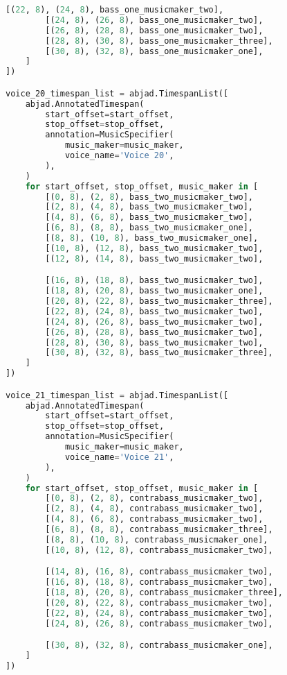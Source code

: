 \begin{lstlisting}[language=Python, caption=Invocation Source Code]
        [(22, 8), (24, 8), bass_one_musicmaker_two],
        [(24, 8), (26, 8), bass_one_musicmaker_two],
        [(26, 8), (28, 8), bass_one_musicmaker_two],
        [(28, 8), (30, 8), bass_one_musicmaker_three],
        [(30, 8), (32, 8), bass_one_musicmaker_one],
    ]
])

voice_20_timespan_list = abjad.TimespanList([
    abjad.AnnotatedTimespan(
        start_offset=start_offset,
        stop_offset=stop_offset,
        annotation=MusicSpecifier(
            music_maker=music_maker,
            voice_name='Voice 20',
        ),
    )
    for start_offset, stop_offset, music_maker in [
        [(0, 8), (2, 8), bass_two_musicmaker_two],
        [(2, 8), (4, 8), bass_two_musicmaker_two],
        [(4, 8), (6, 8), bass_two_musicmaker_two],
        [(6, 8), (8, 8), bass_two_musicmaker_one],
        [(8, 8), (10, 8), bass_two_musicmaker_one],
        [(10, 8), (12, 8), bass_two_musicmaker_two],
        [(12, 8), (14, 8), bass_two_musicmaker_two],

        [(16, 8), (18, 8), bass_two_musicmaker_two],
        [(18, 8), (20, 8), bass_two_musicmaker_one],
        [(20, 8), (22, 8), bass_two_musicmaker_three],
        [(22, 8), (24, 8), bass_two_musicmaker_two],
        [(24, 8), (26, 8), bass_two_musicmaker_two],
        [(26, 8), (28, 8), bass_two_musicmaker_two],
        [(28, 8), (30, 8), bass_two_musicmaker_two],
        [(30, 8), (32, 8), bass_two_musicmaker_three],
    ]
])

voice_21_timespan_list = abjad.TimespanList([
    abjad.AnnotatedTimespan(
        start_offset=start_offset,
        stop_offset=stop_offset,
        annotation=MusicSpecifier(
            music_maker=music_maker,
            voice_name='Voice 21',
        ),
    )
    for start_offset, stop_offset, music_maker in [
        [(0, 8), (2, 8), contrabass_musicmaker_two],
        [(2, 8), (4, 8), contrabass_musicmaker_two],
        [(4, 8), (6, 8), contrabass_musicmaker_two],
        [(6, 8), (8, 8), contrabass_musicmaker_three],
        [(8, 8), (10, 8), contrabass_musicmaker_one],
        [(10, 8), (12, 8), contrabass_musicmaker_two],

        [(14, 8), (16, 8), contrabass_musicmaker_two],
        [(16, 8), (18, 8), contrabass_musicmaker_two],
        [(18, 8), (20, 8), contrabass_musicmaker_three],
        [(20, 8), (22, 8), contrabass_musicmaker_two],
        [(22, 8), (24, 8), contrabass_musicmaker_two],
        [(24, 8), (26, 8), contrabass_musicmaker_two],

        [(30, 8), (32, 8), contrabass_musicmaker_one],
    ]
])


\end{lstlisting}
